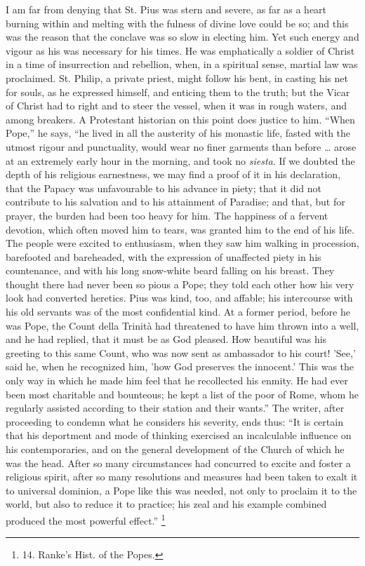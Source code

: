 I am far from denying that St.
Pius was stern and severe, as far as a heart burning within and
melting with the fulness of divine love could be so; and this was the
reason that the conclave was so slow in electing him. Yet such energy
and vigour as his was necessary for his times. He was emphatically a
soldier of Christ in a time of insurrection and rebellion, when, in a
spiritual sense, martial law was proclaimed. St. Philip, a private
priest, might follow his bent, in casting his net for souls, as he
expressed himself, and enticing them to the truth; but the Vicar of
Christ had to right and to steer the vessel, when it was in rough
waters, and among breakers. A Protestant historian on this point does
justice to him. ``When Pope,'' he says, ``he lived in all the austerity
of his monastic life, fasted with the utmost rigour and punctuality,
would wear no finer garments than before … arose at an extremely
early hour in the morning, and took no \emph{siesta}. If we doubted
the depth of his religious earnestness, we may find a proof of it in
his declaration, that the Papacy was unfavourable to his advance in
piety; that it did not contribute to his salvation and to his
attainment of Paradise; and that, but for prayer, the burden had been
too heavy for him. The happiness of a fervent devotion, which often
moved him to tears, was granted him to the end of his life. The people were excited to enthusiasm, when they saw him walking in
procession, barefooted and bareheaded, with the expression of
unaffected piety in his countenance, and with his long snow-white
beard falling on his breast. They thought there had never been so
pious a Pope; they told each other how his very look had converted
heretics. Pius was kind, too, and affable; his intercourse with his
old servants was of the most confidential kind. At a former period,
before he was Pope, the Count della Trinità had threatened to have
him thrown into a well, and he had replied, that it must be as God
pleased. How beautiful was his greeting to this same Count, who was
now sent as ambassador to his court! 'See,' said he, when he
recognized him, 'how God preserves the innocent.' This was the only
way in which he made him feel that he recollected his enmity. He had
ever been most charitable and bounteous; he kept a list of the poor of
Rome, whom he regularly assisted according to their station and their
wants.'' The writer, after proceeding to condemn what he considers his
severity, ends thus: ``It is certain that his deportment and mode of
thinking exercised an incalculable influence on his contemporaries,
and on the general development of the Church of which he was the head.
After so many circumstances had concurred to excite and foster a
religious spirit, after so many resolutions and measures had been
taken to exalt it to universal dominion, a Pope like this was needed,
not only to proclaim it to the world, but also to reduce it to
practice; his zeal and his example combined produced the most powerful
effect.'' \footnote{14.
Ranke's Hist. of the Popes.}

